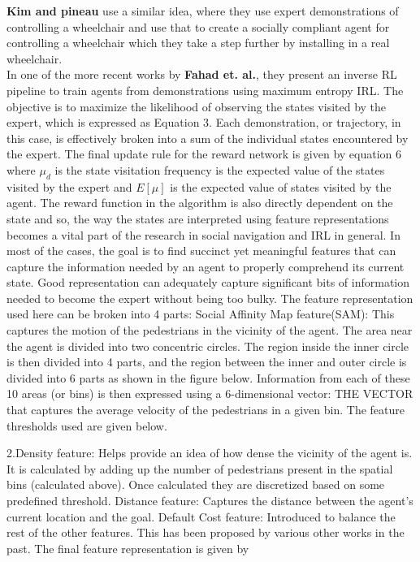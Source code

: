 \textbf{Kim and pineau} use a similar idea, where they use expert demonstrations of controlling a wheelchair and use that to create a socially compliant agent for controlling a wheelchair which they take a step further by installing in a real wheelchair. \\
In one of the more recent works by \textbf{Fahad et. al.}, they present an inverse RL pipeline to train agents from demonstrations using maximum entropy IRL.
The objective is to maximize the likelihood of observing the states visited by the expert, which is expressed as Equation 3.
Each demonstration, or trajectory, in this case, is effectively broken into a sum of the individual states encountered by the expert. The final update rule for the reward network is given by equation 6 
where $\mu_{d}$ is the state visitation frequency is the expected value of the states visited by the expert and $E[\mu]$ is the expected value of states visited by the agent. The reward function in the algorithm is also directly dependent on the state and so, the way the states are interpreted using feature representations becomes a vital part of the research in social navigation and IRL in general. 
In most of the cases, the goal is to find succinct yet meaningful features that can capture the information needed by an agent to properly comprehend its current state. Good representation can adequately capture significant bits of information needed to become the expert without being too bulky.  The feature representation used here can be broken into 4 parts:
Social Affinity Map feature(SAM): This captures the motion of the pedestrians in the vicinity of the agent. The area near the agent is divided into two concentric circles. The region inside the inner circle is then divided into 4 parts, and the region between the inner and outer circle is divided into 6 parts as shown in the figure below.
Information from each of these 10 areas (or bins) is then expressed using a 6-dimensional vector:
THE VECTOR	
that captures the average velocity of the pedestrians in a given bin. The feature thresholds used are given below.

2.Density feature: Helps provide an idea of how dense the vicinity of the agent is. It is calculated by adding up the number of pedestrians present in the spatial bins (calculated above). Once calculated they are discretized based on some predefined threshold.
Distance feature: Captures the distance between the agent's current location and the goal.
Default Cost feature: Introduced to balance the rest of the other features. This has been proposed by various other works in the past.
The final feature representation is given by 

